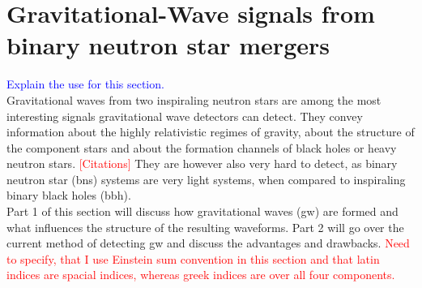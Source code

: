 \section{Gravitational-Wave signals from binary neutron star mergers}
\textcolor{blue}{Explain the use for this section.}\\
Gravitational waves from two inspiraling neutron stars are among the most interesting signals gravitational wave detectors can detect. They convey information about the highly relativistic regimes of gravity, about the structure of the component stars and about the formation channels of black holes or heavy neutron stars. \textcolor{red}{[Citations]} They are however also very hard to detect, as binary neutron star (\gls{bns}) systems are very light systems, when compared to inspiraling binary black holes (\gls{bbh}).\\
Part 1 of this section will discuss how gravitational waves (\gls{gw}) are formed and what influences the structure of the resulting waveforms. Part 2 will go over the current method of detecting \gls{gw} and discuss the advantages and drawbacks. \textcolor{red}{Need to specify, that I use Einstein sum convention in this section and that latin indices are spacial indices, whereas greek indices are over all four components.}
